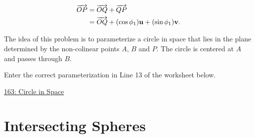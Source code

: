\documentclass{ximera}
\begin{document}
\begin{question}
\begin{enumerate}
{\begin{expandable}
\begin{align*}
   \overrightarrow{OP} &= \overrightarrow{OQ} + \overrightarrow{QP} \\
                                   & = \overrightarrow{OQ} + (\cos\phi_1) {\bf u} + (\sin\phi_1){\bf v} .
\end{align*}
\end{expandable}
}

\end{enumerate}

\end{question}


\begin{question}  \label{Q9df43r23rfddfs}
The idea of this problem is to parameterize a circle in space that lies in the plane determined by the non-colinear points $A$, $B$ and $P$. The circle is centered at $A$ and passes through $B$.

Enter the correct parameterization in Line 13 of the worksheet below.


\begin{onlineOnly}
    \begin{center}
\end{center}
\end{onlineOnly}

\href{https://www.desmos.com/3d/4qvuqtp4lo}{163: Circle in Space}

\end{question}




\section{Intersecting Spheres}
\end{document}
